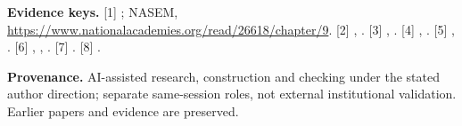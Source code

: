 \documentclass[10pt]{article}
\begin{document}
{\footnotesize\textbf{Evidence keys.} [1] ; NASEM, \url{https://www.nationalacademies.org/read/26618/chapter/9}. [2] , . [3] , . [4] , . [5] , . [6] , , . [7] . [8] .\par
\textbf{Provenance.} AI-assisted research, construction and checking under the stated author direction; separate same-session roles, not external institutional validation. Earlier papers and evidence are preserved.}
\end{document}

